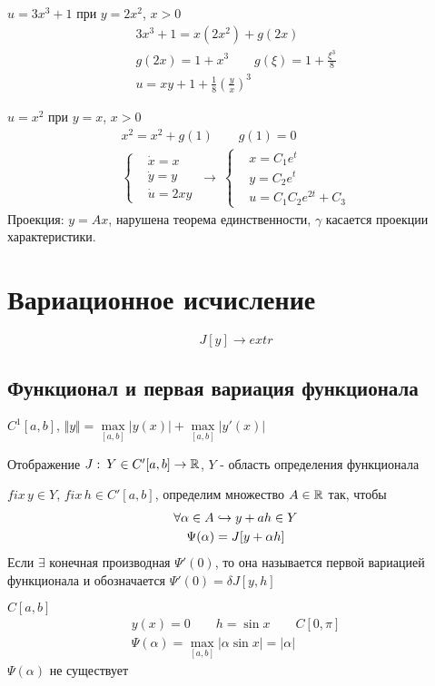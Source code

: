 \documentclass{article}
\begin{document}
\begin{eg}
  $u=3x^{3} + 1$ при $y=2x^{2}$, $x>0$
  \begin{gather*}
    3x^{3}+1=x(2x^{2})+g(2x) \\ 
    g(2x) = 1 + x^{3} \qquad g(\xi)=1+\frac{\xi^{3}}{8} \\ 
    u=xy+1+\frac{1}{8}\left(\frac{y}{x}\right)^{3}
  \end{gather*}
\end{eg}
\begin{eg}
  $u=x^{2}$ при $y=x$, $x>0$
  \begin{gather*}
    x^2=x^2+g(1) \qquad g(1)=0 \\ 
    \left\{\begin{aligned}
      & \dot{x}=x \\ 
      & \dot{y}=y \\ 
      & \dot{u}=2xy
    \end{aligned}\right. \ \rightarrow \ \left\{\begin{aligned}
      & x= C_1e^{t} \\ 
      & y= C_2e^{t} \\ 
      & u=C_1C_2e^{2t} + C_3
    \end{aligned}\right.
  \end{gather*}
  Проекция: $y=Ax$, нарушена теорема единственности, $\gamma$ касается проекции характеристики.
\end{eg}

\section{Вариационное исчисление}
\[
  J[y]\to extr
\]
\subsection{Функционал и первая вариация функционала}
$C^{1}[a,b]$, $\Vert y \Vert=\max \limits_{[a,b]} |y(x)| + \max \limits_{[a,b]}|y'(x)|$
\begin{definition}[Функционал]
  Отображение $J: \: Y\in C'[a,b] \to \mathbb{R}$, $Y$ - область определения функционала
\end{definition}
$fix \, y\in Y$, $fix\, h \in C'[a,b]$, определим множество $A\in \mathbb{R}$ так,
чтобы
\begin{gather*}
  \forall \alpha \in A \hookrightarrow y+ah\in Y \\ 
  \Psi(\alpha)=J[y+\alpha h]
\end{gather*}
Если $\exists$ конечная производная $\Psi'(0)$, то она называется
первой вариацией функционала и обозначается $\Psi'(0)=\delta J[y,h]$
\begin{eg}
  $C[a,b]$
  \begin{gather*}
    y(x) =0 \qquad h=\sin x \qquad C[0,\pi] \\ 
    \Psi(\alpha)=\max \limits_{[a,b]}|\alpha \sin x|=|\alpha|
  \end{gather*}
  $\Psi(\alpha)$ не существует
\end{eg}
\end{document}
